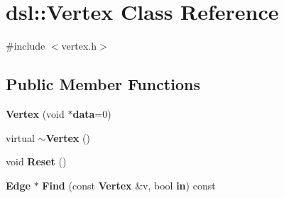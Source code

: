\section{dsl\-:\-:Vertex Class Reference}
\label{classdsl_1_1Vertex}


{\ttfamily \#include $<$vertex.\-h$>$}

\subsection*{Public Member Functions}
\begin{DoxyCompactItemize}
\item 
{\bf Vertex} (void $\ast${\bf data}=0)
\item 
virtual {\bf $\sim$\-Vertex} ()
\item 
void {\bf Reset} ()
\item 
{\bf Edge} $\ast$ {\bf Find} (const {\bf Vertex} \&v, bool {\bf in}) const 
\end{DoxyCompactItemize}
